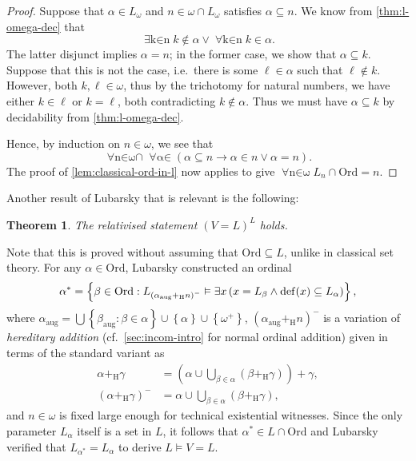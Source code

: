 \documentclass[12pt,openany]{book}
\theoremstyle{plain}
\newtheorem{theorem}{Theorem}[section]
\theoremstyle{definition}
\newcommand\opA[1]{\mathop{\forall #1}}
\newcommand\opE[1]{\mathop{\exists #1}}
\DeclareMathOperator\dd{def}
\newcommand\Ord{\mathrm{Ord}}
\begin{document}
\begin{proof}
  Suppose that $\alpha \in L_\omega$ and $n \in \omega \cap L_\omega$ satisfies $\alpha \subseteq n$. We know from \autoref{thm:l-omega-dec} that
  \[\opE{k \in n} k \not\in \alpha \lor \opA{k \in n} k \in \alpha.\]
  The latter disjunct implies $\alpha = n$; in the former case, we show that $\alpha \subseteq k$. Suppose that this is not the case, i.e.\ there is some $\ell \in \alpha$ such that $\ell \not\in k$. However, both $k, \ell \in \omega$, thus by the trichotomy for natural numbers, we have either $k \in \ell$ or $k = \ell$, both contradicting $k \not\in \alpha$. Thus we must have $\alpha \subseteq k$ by decidability from \autoref{thm:l-omega-dec}.

  Hence, by induction on $n \in \omega$, we see that
  \[\opA{n \in \omega \cap L_\omega} \opA{\alpha \in L_\omega} \left(\alpha \subseteq n \rightarrow \alpha \in n \lor \alpha = n\right).\]
  The proof of \autoref{lem:classical-ord-in-l} now applies to give $\opA{n \in \omega} L_n \cap \Ord = n$.
\end{proof}

Another result of Lubarsky \cite{lubarsky93-intuitionistic-l} that is relevant is the following:
\begin{theorem}
  The relativised statement $\left(V = L\right)^L$ holds.
\end{theorem}

Note that this is proved without assuming that $\Ord \subseteq L$, unlike in classical set theory. For any $\alpha \in \Ord$, Lubarsky constructed an ordinal
\[\alpha^* = \left\{\beta \in \Ord : L_{\left(\alpha_\text{aug} +_\mathrm{H} n\right)^-} \vDash \opE{x} \left(x = L_\beta \land \dd\mleft(x\mright) \subseteq L_\alpha\right)\right\},\]
where $\alpha_\text{aug} = \bigcup \left\{\beta_\text{aug} : \beta \in \alpha\right\} \cup \left\{\alpha\right\} \cup \left\{\omega^+\right\}$, $\left(\alpha_\text{aug} +_\mathrm{H} n\right)^-$ is a variation of \emph{hereditary addition} (cf.\ \autoref{sec:incom-intro} for normal ordinal addition) given in terms of the standard variant as
\begin{align*}
  \alpha +_\mathrm{H} \gamma                & = \left(\alpha \cup \bigcup_{\beta \in \alpha} \left(\beta +_\mathrm{H} \gamma\right)\right) + \gamma, \\
  \left(\alpha +_\mathrm{H} \gamma\right)^- & = \alpha \cup \bigcup_{\beta \in \alpha} \left(\beta +_\mathrm{H} \gamma\right),
\end{align*}
and $n \in \omega$ is fixed large enough for technical existential witnesses. Since the only parameter $L_\alpha$ itself is a set in $L$, it follows that $\alpha^* \in L \cap \Ord$ and Lubarsky verified that $L_{\alpha^*} = L_\alpha$ to derive $L \vDash V = L$.
\end{document}
